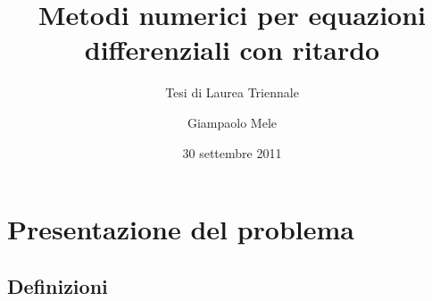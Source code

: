 \documentclass[intlimits]{beamer}
\title[Metodi numerici per DDE]
{Metodi numerici per equazioni differenziali con ritardo}
\subtitle{Tesi di Laurea Triennale}
\author{Giampaolo Mele}
\institute{Università di Pisa}
\date{30 settembre 2011}
\numberwithin{equation}{section}
\theoremstyle{plain}
\theoremstyle{definition}
\theoremstyle{remark}
\begin{document}
\begin{frame}
\titlepage
\end{frame}

\section{Presentazione del problema}

\subsection{Definizioni}
\end{document}
